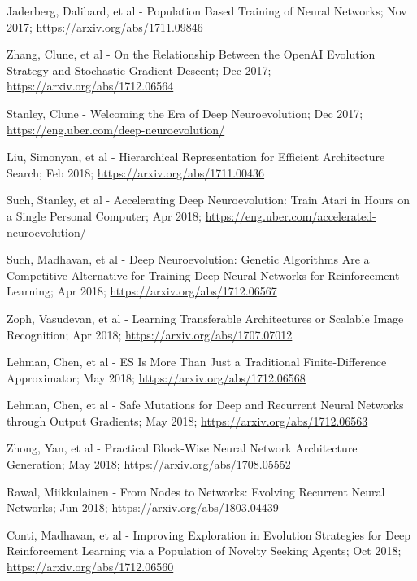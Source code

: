 \documentclass[journal, a4paper]{IEEEtran}
\begin{document}
\begin{thebibliography}{5}
    Jaderberg, Dalibard, et al - Population Based Training of Neural Networks; Nov 2017;
    \url{https://arxiv.org/abs/1711.09846}

    Zhang, Clune, et al - On the Relationship Between the OpenAI Evolution Strategy and Stochastic Gradient Descent; Dec 2017;
    \url{https://arxiv.org/abs/1712.06564}

    Stanley, Clune - Welcoming the Era of Deep Neuroevolution; Dec 2017;
    \url{https://eng.uber.com/deep-neuroevolution/}

    Liu, Simonyan, et al - Hierarchical Representation for Efficient Architecture Search; Feb 2018;
    \url{https://arxiv.org/abs/1711.00436}

    Such, Stanley, et al - Accelerating Deep Neuroevolution: Train Atari in Hours on a Single Personal Computer; Apr 2018;
    \url{https://eng.uber.com/accelerated-neuroevolution/}

    Such, Madhavan, et al - Deep Neuroevolution: Genetic Algorithms Are a Competitive Alternative for Training Deep Neural Networks for Reinforcement Learning; Apr 2018;
    \url{https://arxiv.org/abs/1712.06567}

    Zoph, Vasudevan, et al - Learning Transferable Architectures or Scalable Image Recognition; Apr 2018;
    \url{https://arxiv.org/abs/1707.07012}

    Lehman, Chen, et al - ES Is More Than Just a Traditional Finite-Difference Approximator; May 2018;
    \url{https://arxiv.org/abs/1712.06568}

    Lehman, Chen, et al - Safe Mutations for Deep and Recurrent Neural Networks through Output Gradients; May 2018;
    \url{https://arxiv.org/abs/1712.06563}

    Zhong, Yan, et al - Practical Block-Wise Neural Network Architecture Generation; May 2018;
    \url{https://arxiv.org/abs/1708.05552}

    Rawal, Miikkulainen - From Nodes to Networks: Evolving Recurrent Neural Networks; Jun 2018;
    \url{https://arxiv.org/abs/1803.04439}

    Conti, Madhavan, et al - Improving Exploration in Evolution Strategies for Deep Reinforcement Learning via a Population of Novelty Seeking Agents; Oct 2018;
    \url{https://arxiv.org/abs/1712.06560}


\end{thebibliography}
\end{document}
